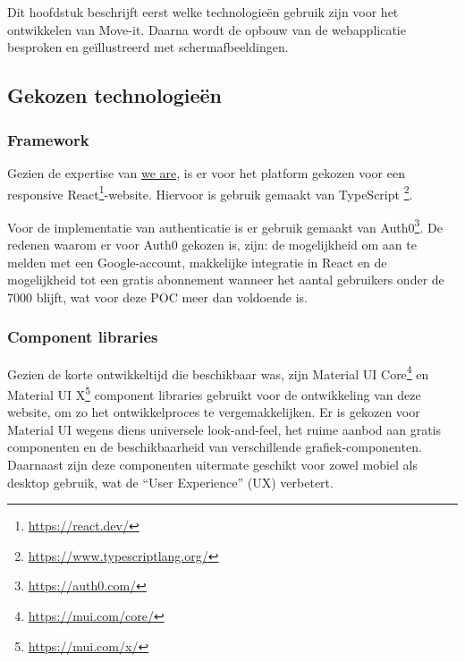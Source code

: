 \chapter{}%
\label{ch:proofofconcept}

Dit hoofdstuk beschrijft eerst welke technologieën gebruik zijn voor het ontwikkelen van Move-it. Daarna wordt de opbouw van de webapplicatie besproken en geïllustreerd met schermafbeeldingen.

\section{Gekozen technologieën}

\subsection{Framework}

Gezien de expertise van \href{https://www.we-are.be/}{we are}, is er voor het platform gekozen voor een responsive React\footnote{\href{https://react.dev/}{https://react.dev/}}-website. Hiervoor is gebruik gemaakt van TypeScript \footnote{\href{https://www.typescriptlang.org/}{https://www.typescriptlang.org/}}.

Voor de implementatie van authenticatie is er gebruik gemaakt van Auth0\footnote{\href{https://auth0.com/}{https://auth0.com/}}. De redenen waarom er voor Auth0 gekozen is, zijn: de mogelijkheid om aan te melden met een Google-account, makkelijke integratie in React en de mogelijkheid tot een gratis abonnement wanneer het aantal gebruikers onder de 7000 blijft, wat voor deze POC meer dan voldoende is.

\subsection{Component libraries}
Gezien de korte ontwikkeltijd die beschikbaar was, zijn Material UI Core\footnote{\href{https://mui.com/core/}{https://mui.com/core/}} en Material UI X\footnote{\href{https://mui.com/x/}{https://mui.com/x/}} component libraries gebruikt voor de ontwikkeling van deze website, om zo het ontwikkelproces te vergemakkelijken. Er is gekozen voor Material UI wegens diens universele look-and-feel, het ruime aanbod aan gratis componenten en de beschikbaarheid van verschillende grafiek-componenten. Daarnaast zijn deze componenten uitermate geschikt voor zowel mobiel als desktop gebruik, wat de ``User Experience'' (UX) verbetert.


